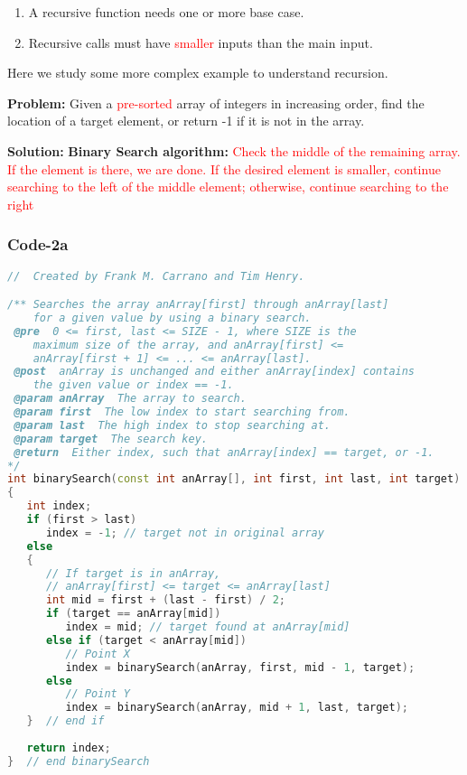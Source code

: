 \documentclass{article}
\newcommand{\red}[1]{\textcolor{red}{#1}}
\begin{document}
\begin{enumerate}
\item A recursive function needs one or more base case.
\item Recursive calls must have \red{smaller} inputs than the main input.
\end{enumerate}
Here we study some more complex example to understand recursion.

\medskip

\textbf{Problem:} Given a \red{pre-sorted} array of integers in increasing order, find the location of a target element, or return -1
if it is not in the array. 

\medskip

\textbf{Solution:} \textbf{Binary Search algorithm:} \red{Check the middle of the remaining array. If the
element is there, we are done. If the desired element is smaller, continue searching to the left of the middle
element; otherwise, continue searching to the right}

\subsubsection*{Code-2a}
\begin{lstlisting}[language=C++]
//  Created by Frank M. Carrano and Tim Henry.

/** Searches the array anArray[first] through anArray[last]
    for a given value by using a binary search.
 @pre  0 <= first, last <= SIZE - 1, where SIZE is the
    maximum size of the array, and anArray[first] <=
    anArray[first + 1] <= ... <= anArray[last].
 @post  anArray is unchanged and either anArray[index] contains
    the given value or index == -1.
 @param anArray  The array to search.
 @param first  The low index to start searching from.
 @param last  The high index to stop searching at.
 @param target  The search key.
 @return  Either index, such that anArray[index] == target, or -1.
*/
int binarySearch(const int anArray[], int first, int last, int target)
{
   int index;
   if (first > last)
      index = -1; // target not in original array
   else
   {
      // If target is in anArray,
      // anArray[first] <= target <= anArray[last]
      int mid = first + (last - first) / 2;
      if (target == anArray[mid])
         index = mid; // target found at anArray[mid]
      else if (target < anArray[mid])
         // Point X
         index = binarySearch(anArray, first, mid - 1, target);
      else
         // Point Y
         index = binarySearch(anArray, mid + 1, last, target);
   }  // end if
   
   return index;
}  // end binarySearch

\end{lstlisting}
\end{document}
